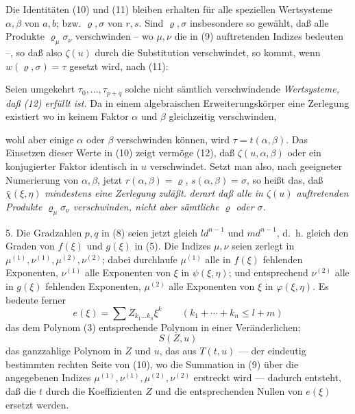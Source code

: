 Die Identitäten (10) und (11) bleiben erhalten für alle speziellen Wertsysteme $\alpha,\beta$ von $a,b$; bzw. $\varrho,\sigma$ von $r,s$. Sind $\varrho,\sigma$ insbesondere so gewählt, daß alle Produkte $\varrho_\mu\sigma_\nu$ verschwinden -- wo $\mu,\nu$ die in (9) auftretenden Indizes bedeuten --, so daß also $\zeta(u)$ durch die Substitution verschwindet, so kommt, wenn $w(\varrho,\sigma)=\tau$ gesetzt wird, nach (11):

Seien umgekehrt $\tau_0,\ldots,\tau_{p+q}$ solche nicht sämtlich verschwindende \emph{Wertsysteme, daß (12) erfüllt ist.} Da in einem algebraischen Erweiterungskörper eine Zerlegung existiert
wo in keinem Faktor $\alpha$ und $\beta$ gleichzeitig verschwinden,\addtocounter{footnote}{1} wohl aber einige $\alpha$ oder $\beta$ verschwinden können, wird $\tau=t(\alpha,\beta)$. Das Einsetzen dieser Werte in (10) zeigt vermöge (12), daß $\zeta(u,\alpha,\beta)$ oder ein konjugierter Faktor identisch in $u$ verschwindet. Setzt man also, nach geeigneter Numerierung von $\alpha,\beta$, jetzt $r(\alpha,\beta)=\varrho$, $s(\alpha,\beta)=\sigma$, so heißt das, daß $\bar\chi(\xi,\eta)$ \emph{mindestens eine Zerlegung zuläßt.}
\emph{derart daß alle in $\zeta(u)$ auftretenden Produkte $\varrho_\mu\sigma_\nu$ verschwinden, nicht aber sämtliche $\varrho$ oder $\sigma$.}

5. Die Gradzahlen $p,q$ in (8) seien jetzt gleich $ld^{n-1}$ und $md^{n-1}$, d.~h. gleich den Graden von $f(\xi)$ und $g(\xi)$ in (5). Die Indizes $\mu,\nu$ seien zerlegt in $\mu^{(1)},\nu^{(1)},\mu^{(2)},\nu^{(2)}$; dabei durchlaufe $\mu^{(1)}$ alle in $f(\xi)$ fehlenden Exponenten, $\nu^{(1)}$ alle Exponenten von $\xi$ in $\psi(\xi,\eta)$; und entsprechend $\nu^{(2)}$ alle in $g(\xi)$ fehlenden Exponenten, $\mu^{(2)}$ alle Exponenten von $\xi$ in $\varphi(\xi,\eta)$. Es bedeute ferner
\[
 e(\xi)=\sum Z_{k_1\ldots k_n}\xi^k\qquad(k_1+\cdots+k_n\le l+m)
\]
das dem Polynom (3) entsprechende Polynom in einer Veränderlichen;
\[
 S(Z,u)
\]
das ganzzahlige Polynom in $Z$ und $u$, das aus $T(t,u)$ --- der eindeutig bestimmten rechten Seite von (10), wo die Summation in (9) über die angegebenen Indizes $\mu^{(1)},\nu^{(1)},\mu^{(2)},\nu^{(2)}$ erstreckt wird --- dadurch entsteht, daß die $t$ durch die Koeffizienten $Z$ und die entsprechenden Nullen von $e(\xi)$ ersetzt werden.

